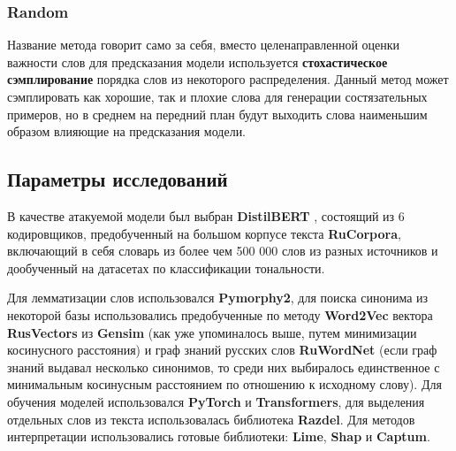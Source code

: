 \subsubsection{Random}

\noindent\hspace{0.6cm}Название метода говорит само за себя, вместо целенаправленной оценки важности слов для предсказания модели используется \textbf{стохастическое сэмплирование} порядка слов из некоторого распределения. Данный метод может сэмплировать как хорошие, так и плохие слова для генерации состязательных примеров, но в среднем на передний план будут выходить слова наименьшим образом влияющие на предсказания модели.

\subsection{Параметры исследований}

\noindent\hspace{0.6cm}В качестве атакуемой модели был выбран \textbf{DistilBERT} \cite{general3}, состоящий из 6 кодировщиков, предобученный на большом корпусе текста \textbf{RuCorpora}, включающий в себя словарь из более чем 500 000 слов из разных источников и дообученный на датасетах по классификации тональности.

\noindent\hspace{0.6cm}Для лемматизации  слов использовался \textbf{Pymorphy2}, для поиска синонима из некоторой базы использовались предобученные по методу \textbf{Word2Vec} \cite{general4} вектора \textbf{RusVectors} из \textbf{Gensim} (как уже упоминалось выше, путем минимизации косинусного расстояния) и граф знаний русских слов \textbf{RuWordNet} (если граф знаний выдавал несколько синонимов, то среди них выбиралось единственное с минимальным косинусным расстоянием по отношению к исходному слову). Для обучения моделей использовался \textbf{PyTorch} и \textbf{Transformers}, для выделения отдельных слов из текста использовалась библиотека \textbf{Razdel}. Для методов интерпретации использовались готовые библиотеки: \textbf{Lime}, \textbf{Shap} и \textbf{Captum}.